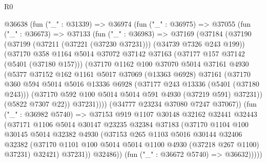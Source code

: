 \begin{lexlean}{R0}
\begin{coremodule}
      @36638
        (fun ("_" : @31339) =>
        @36974
          (fun ("_" : @36975) =>
          @37055
            (fun ("_" : @36673) =>
            @37133
              (fun ("_" : @36983) =>
              @37169
                (@37184
                  (@37190
                    (@37199 (@37211 (@37221 (@37230 @37231))) (@34739 @7326 @243 @199))
                    (@37170
                      @358
                      @1164
                      @5014
                      @37072
                      @37142
                      @37163
                      (@37177 @157 @37142 (@5401 (@37180 @157)))
                      (@37170
                        @1162
                        @100
                        @37070
                        @5014
                        @37161
                        @4930
                        (@5377
                          @37152
                          @162
                          @1161
                          @5017
                          @37069
                          (@13363 @6928)
                          @37161
                          (@37170
                            @360
                            @594
                            @5014
                            @5016
                            @13336
                            @6928
                            (@37177 @243 @13336 (@5401 (@37180 @243)))
                            (@37170 @592 @100 @5014 @5014 @591 @4930 (@37219 @591) @37231))
                          (@5822 @7307 @22))
                        @37231))))
                (@34777 @23234 @37080 @7247 @37067))
              (fun ("_" : @36982 @5740) =>
              @37153
                @919
                @1107
                @30148
                @32162
                @32441
                @32443
                (@37171
                  @1106
                  @5014
                  @30147
                  @23235
                  @32384
                  @37183
                  (@37170
                    @1104
                    @100
                    @30145
                    @5014
                    @32382
                    @4930
                    (@37153
                      @265
                      @1103
                      @5016
                      @30144
                      @32406
                      @32382
                      (@37170 @1101 @100 @5014 @5014 @1100 @4930 (@37218 @267 @1100) @37231)
                      @32421)
                    @37231))
                @32486))
            (fun ("_" : @36672 @5740) => @36632)))))

\end{coremodule}
\end{lexlean}

